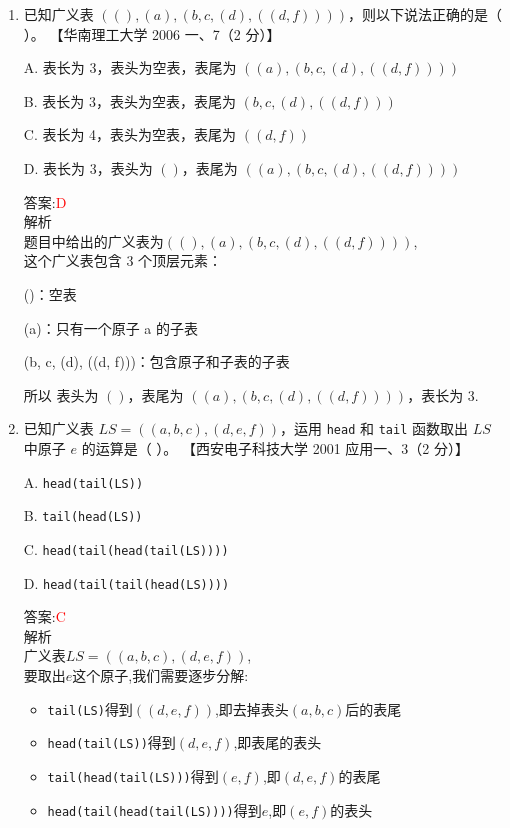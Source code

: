 \documentclass[lang=cn,newtx,10pt,scheme=chinese]{../elegantbook}
\begin{document}
\begin{enumerate}
    \item 已知广义表 $((), (a), (b, c, (d), ((d, f))))$，则以下说法正确的是（ ）。  
    【华南理工大学 2006 一、7（2 分）】  

    A. 表长为 3，表头为空表，表尾为 $((a), (b, c, (d), ((d, f))))$  

    B. 表长为 3，表头为空表，表尾为 $(b, c, (d), ((d, f)))$  

    C. 表长为 4，表头为空表，表尾为 $((d, f))$  

    D. 表长为 3，表头为 $()$，表尾为 $((a), (b, c, (d), ((d, f))))$  

    答案:\textcolor{red}{D}\\
    解析\\
    题目中给出的广义表为$((), (a), (b, c, (d), ((d, f))))$,\\
    这个广义表包含 3 个顶层元素：

    ()：空表

    (a)：只有一个原子 a 的子表

    (b, c, (d), ((d, f)))：包含原子和子表的子表

    所以 表头为 $()$，表尾为 $((a), (b, c, (d), ((d, f))))$，表长为 3.\\
    \item 已知广义表 $LS = ((a, b, c), (d, e, f))$，运用 \texttt{head} 和 \texttt{tail} 函数取出 $LS$ 中原子 $e$ 的运算是（ ）。  
    【西安电子科技大学 2001 应用一、3（2 分）】

    A. \texttt{head(tail(LS))}  

    B. \texttt{tail(head(LS))}  

    C. \texttt{head(tail(head(tail(LS))))}  

    D. \texttt{head(tail(tail(head(LS))))}  
    
    答案:\textcolor{red}{C}\\
    解析\\
    广义表$LS = ((a, b, c), (d, e, f))$,\\
    要取出$e$这个原子,我们需要逐步分解:
    \begin{itemize}
        \item \texttt{tail(LS)}得到$((d, e, f))$,即去掉表头$(a, b, c)$后的表尾
        \item \texttt{head(tail(LS))}得到$(d, e, f)$,即表尾的表头
        \item \texttt{tail(head(tail(LS)))}得到$(e, f)$,即$(d, e, f)$的表尾
        \item \texttt{head(tail(head(tail(LS))))}得到$e$,即$(e, f)$的表头
    \end{itemize}
    

\end{enumerate}
\end{document}
